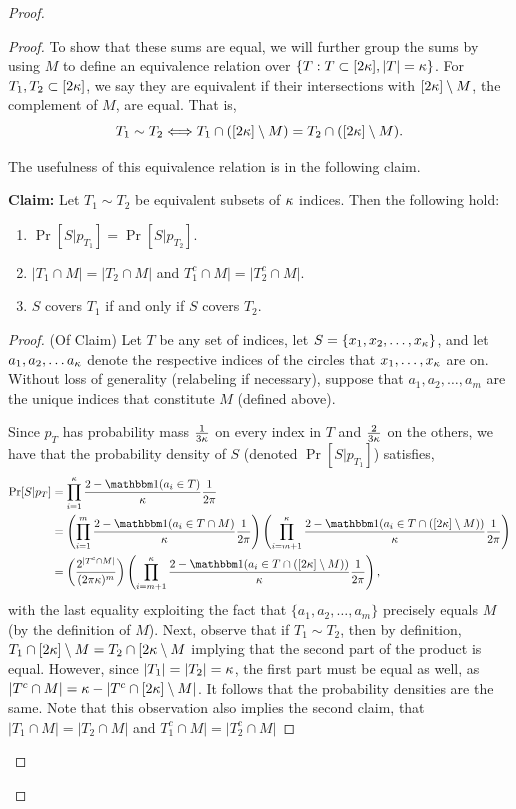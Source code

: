 \begin{proof}
\begin{proof}
To show that these sums are equal, we will further group the sums by using $M$ to define an equivalence relation over $\{T: T \subset [2\kappa], |T| = \kappa\}$. For $T_1, T_2 \subset [2\kappa]$, we say they are equivalent if their intersections with $[2\kappa] \setminus M$, the complement of $M$, are equal. That is, $$T_1 \sim T_2 \Longleftrightarrow T_1 \cap ([2\kappa] \setminus M) = T_2 \cap ([2\kappa] \setminus M).$$ 

The usefulness of this equivalence relation is in the following claim.

\textbf{Claim:} Let $T_1 \sim T_2$ be equivalent subsets of $\kappa$ indices.  Then the following hold:
\begin{enumerate}
	\item $\Pr[S|p_{T_1}] = \Pr[S|p_{T_2}]$.
	\item $|T_1 \cap M| = |T_2 \cap M|$ and $T_1^c \cap M| = |T_2^c \cap M|$.
	\item $S$ covers $T_1$ if and only if $S$ covers $T_2$. 
\end{enumerate}

\begin{proof}
(Of Claim) Let $T$ be any set of indices, let $S = \{x_1, x_2, \dots, x_\kappa\}$, and let $a_1, a_2, \dots a_\kappa$ denote the respective indices of the circles that $x_1, \dots, x_\kappa$ are on. Without loss of generality (relabeling if necessary), suppose that $a_1, a_2, \dots, a_m$ are the unique indices that constitute $M$ (defined above).

Since $p_T$ has probability mass $\frac{1}{3\kappa}$ on every index in $T$ and $\frac{2}{3\kappa}$ on the others, we have that the probability density of $S$ (denoted $\Pr[S|p_{T_1}]$) satisfies,
\begin{equation*}
\begin{split}
\Pr[S|p_{T}] &= \prod_{i= 1}^\a \frac{2 - \ind(a_i \in T)}{\a}\frac{1}{2\pi}\\
&= \left(\prod_{i=1}^m \frac{2 - \ind(a_i \in T \cap M)}{\a}\frac{1}{2\pi}\right)\left(\prod_{i=m+1}^{\a} \frac{2 - \ind(a_i \in T \cap ([2\a] \setminus M))}{\a}\frac{1}{2\pi}\right) \\
&= \left(\frac{2^{|T^c \cap M|}}{(2\pi \a)^m}\right) \left(\prod_{i=m+1}^{\a} \frac{2 - \ind(a_i \in T \cap ([2\a] \setminus M))}{\a}\frac{1}{2\pi}\right),
\end{split}
\end{equation*}
with the last equality exploiting the fact that $\{a_1, a_2, \dots, a_m\}$ precisely equals $M$ (by the definition of $M$). Next, observe that if $T_1 \sim T_2$, then by definition, $T_1 \cap [2\kappa] \setminus M = T_2 \cap [2\kappa \setminus M$ implying that the second part of the product is equal. However, since $|T_1| = |T_2| = \kappa$, the first part must be equal as well, as $|T^c \cap M| = \kappa - |T^c \cap [2\kappa] \setminus M|$. It follows that the probability densities are the same. Note that this observation also implies the second claim, that $|T_1 \cap M| = |T_2 \cap M|$ and $T_1^c \cap M| = |T_2^c \cap M|$


\end{proof}
\end{proof}
\end{proof}
